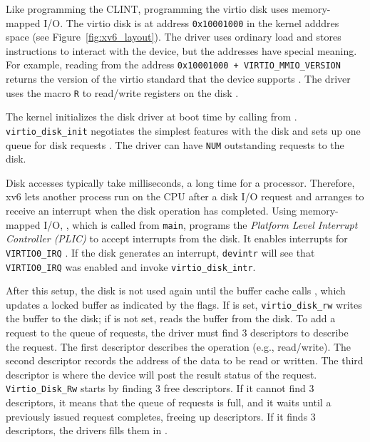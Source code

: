 Like programming the CLINT, programming the virtio disk uses memory-mapped
I/O.  The virtio disk is at address \lstinline{0x10001000} in the
kernel adddres space (see Figure~\ref{fig:xv6_layout}).  The driver
uses ordinary load and stores instructions to interact with the
device, but the addresses have special meaning.  For example, reading
from the address \lstinline{0x10001000 + VIRTIO_MMIO_VERSION}
 returns the version of the virtio
standard that the device supports
.  The driver uses the
macro \lstinline{R} to read/write registers on the disk
.

The kernel initializes the disk driver at boot time by calling
 from
 .
\lstinline{virtio_disk_init} negotiates the simplest features with the
disk  and sets
up one queue for disk requests .  The driver can have
\lstinline{NUM} outstanding requests to the disk.

Disk accesses typically take milliseconds, a long time for a
processor.  Therefore, xv6 lets another process run on the CPU after a
disk I/O request and arranges to receive an interrupt when the disk
operation has completed.  Using memory-mapped I/O,
, which is called from \lstinline{main}, programs
the \textit{Platform Level Interrupt Controller (PLIC)} to
accept interrupts from the disk.  It enables interrupts for
\lstinline{VIRTIO0_IRQ} .  If the
disk generates an interrupt, \lstinline{devintr}
 will see that
\lstinline{VIRTIO0_IRQ} was enabled and invoke
\lstinline{virtio_disk_intr}.

After this setup, the disk is not used again until the buffer cache calls
,
which updates a locked buffer
as indicated by the flags.
If
is set,
\lstinline{virtio_disk_rw}
writes the buffer
to the disk; if
is not set,
reads the buffer from the disk.
To add a request to the queue of requests, the driver must find 3
descriptors to describe the request.  The first descriptor
describes the operation (e.g., read/write).  The second descriptor
records the address of the data to be read or written. The third
descriptor is where the device will post the result status of the
request.  \lstinline{Virtio_Disk_Rw} starts by finding 3 free descriptors.  If
it cannot find 3 descriptors, it means that the queue of requests is
full, and it waits until a previously issued request completes, freeing
up descriptors.   If it finds 3 descriptors, the drivers fills them
in .

